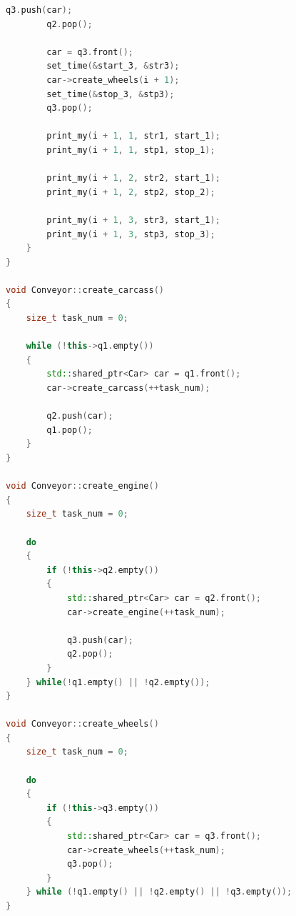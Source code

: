 \documentclass[12pt]{report}
\begin{document}
\begin{lstlisting}[label=some-code,caption=Реализация класса конвейера, language=C++]
        q3.push(car);
        q2.pop();

        car = q3.front();
        set_time(&start_3, &str3);
        car->create_wheels(i + 1);
        set_time(&stop_3, &stp3);
        q3.pop();

        print_my(i + 1, 1, str1, start_1);
        print_my(i + 1, 1, stp1, stop_1);

        print_my(i + 1, 2, str2, start_1);
        print_my(i + 1, 2, stp2, stop_2);

        print_my(i + 1, 3, str3, start_1);
        print_my(i + 1, 3, stp3, stop_3);
    }
}

void Conveyor::create_carcass()
{
	size_t task_num = 0;
	
	while (!this->q1.empty())
	{
		std::shared_ptr<Car> car = q1.front();
		car->create_carcass(++task_num);
		
		q2.push(car);
		q1.pop();
	}
}

void Conveyor::create_engine()
{
	size_t task_num = 0;
	
	do
	{
		if (!this->q2.empty())
		{
			std::shared_ptr<Car> car = q2.front();
			car->create_engine(++task_num);
	
			q3.push(car);
			q2.pop();
		}
	} while(!q1.empty() || !q2.empty());
}

void Conveyor::create_wheels()
{
	size_t task_num = 0;
	
	do
	{
		if (!this->q3.empty())
		{
			std::shared_ptr<Car> car = q3.front();
			car->create_wheels(++task_num);
			q3.pop();
		}
	} while (!q1.empty() || !q2.empty() || !q3.empty());
}
\end{lstlisting}
\end{document}
